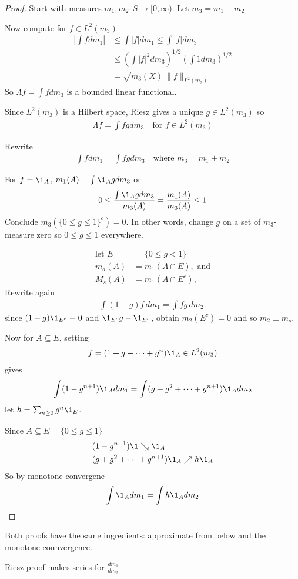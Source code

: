 \begin{proof}
	Start with measures $m_1, m_2 :S \to [0,\infty)$.
	Let  $m_3 = m_1 + m_2$

	Now compute for  $f \in L^2 (m_3)$
	\begin{align*}
		\left| \int f dm_1 \right| &\leq \int |f| dm_1 \leq \int |f| dm_3 \\
						&\leq \left( \int |f|^2 dm_3 \right)^{1/2} \left( \int 1 dm_3 \right)^{1/2}\\
						&= \sqrt{m_3 (X)} \, \|f\|_{L^{2}(m_3)}
	\end{align*}
	So $\Lambda f = \int f dm_3$ is a bounded linear functional.

	Since $L^{2} (m_3)$ is a Hilbert space, Riesz gives a unique $g \in L^{2} (m_3)$ so
	\begin{align*}
		\Lambda f = \int f g dm_3 \quad \text{for } f \in L^{2}(m_3)
	\end{align*}

	Rewrite
	\begin{align*}
		\int f dm_1 = \int f g d m_3 \quad \text{where $m_3 = m_1 + m_2$}
	\end{align*}

	For $f = \1_{A}$, $m_1 (A) = \int \1_{A} g dm_3$ or
	\begin{align*}
		0 \leq \frac{\int \1_{A} g dm_3}{m_3 (A)} = \frac{ m_1 (A)}{m_3 (A)} \leq 1
	\end{align*}
	Conclude $m_3 (\{0 \leq g \leq 1\}^c) = 0$. In other words, change $g$ on a set of $m_3$-measure zero so $0 \leq g \leq 1$ everywhere.

	\begin{align*}
		\text{let  } E &= \{ 0 \leq g < 1 \} \\
		m_a (A) &= m_1 (A \cap E), \text{ and} \\
		M_s (A) &= m_1 (A \cap E^c),
	\end{align*}
	Rewrite again
	\begin{align*}
		\int (1 - g) f \, dm_1 = \int fg \,dm_2.
	\end{align*}
	since $(1 - g) \1_{E^c} \equiv 0$ and $\1_{E^c} g - \1_{E^c}$, obtain $m_2 (E^c) = 0$
	and so $m_2 \perp m_s$. 


	Now for  $A \subseteq E$, setting
	\begin{align*}
		f = (1 + g + \cdots + g^n) \1_{A } \in L^2 (m_3)
	\end{align*} gives
	\begin{align*}
		\int ( 1 - g^{n+1}) \1_{A} dm_1 = \int (g + g^2 + \cdots + g^{n+1}) \1_{A} dm_2
	\end{align*}
	let $h = \sum_{n \geq 0} g^{n} \1_{E}$.

	Since $A \subseteq E = \{ 0 \leq g \leq 1\}$
	\begin{align*}
		&(1 - g^{n+1}) \1 \searrow \1_{A} \\
		&(g + g^2 + \cdots + g^{n+1} ) \1_{A} \nearrow h \1_{A}
	\end{align*}
	So by monotone convergene
	\begin{align*}
		\int \1_{A} dm_1 = \int h \1_{A} dm_2
	\end{align*}
\end{proof}



\begin{remark}
	Both proofs have the same ingredients: approximate from below and the monotone connvergence.

	Riesz proof makes series for $\frac{d m_1}{d m_2}$
\end{remark}


